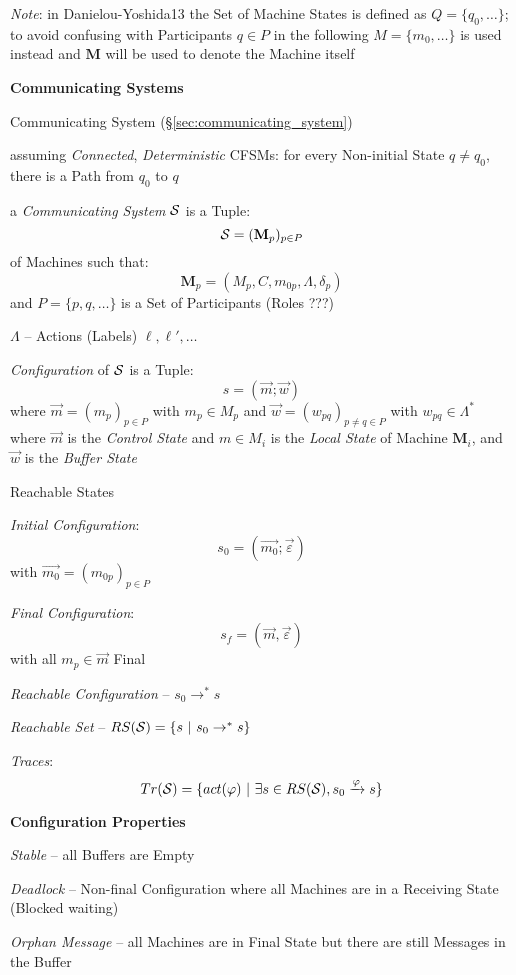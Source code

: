 \fist \emph{Note}: in Danielou-Yoshida13 the Set of Machine States is
defined as $Q = \{q_0,\ldots\}$; to avoid confusing with Participants
$q \in P$ in the following $M = \{m_0, \ldots\}$ is used instead and
$\mathbf{M}$ will be used to denote the Machine itself


\textbf{Communicating Systems}

\fist Communicating System (\S\ref{sec:communicating_system})

assuming \emph{Connected}, \emph{Deterministic} CFSMs: for every
Non-initial State $q \neq q_0$, there is a Path from $q_0$ to $q$

a \emph{Communicating System} $\mathcal{S}$ is a Tuple:
\[
  \mathcal{S} = (\mathbf{M}_p)_{p \in P}
\]
of Machines such that:
\[
  \mathbf{M}_p = (M_p, C, m_{0p}, \Lambda, \delta_p)
\]
and $P = \{p, q, \ldots\}$ is a Set of Participants (Roles ???) %

$\Lambda$ -- Actions (Labels) $\ell, \ell', \ldots$

\emph{Configuration} of $\mathcal{S}$ is a Tuple:
\[
  s = (\vec{m};\vec{w})
\]
where $\vec{m} = (m_p)_{p \in P}$ with $m_p \in M_p$ and $\vec{w} =
(w_{pq})_{p \neq q \in P}$ with $w_{pq} \in \Lambda^*$ where $\vec{m}$
is the \emph{Control State} and $m \in M_i$ is the \emph{Local State}
of Machine $\mathbf{M}_i$, and $\vec{w}$ is the \emph{Buffer State}

Reachable States

\emph{Initial Configuration}:
\[
  s_0 = (\vec{m_0};\vec{\varepsilon})
\]
with $\vec{m_0} = (m_{0p})_{p \in P}$

\emph{Final Configuration}:
\[
  s_f = (\vec{m}, \vec{\varepsilon})
\]
with all $m_p \in \vec{m}$ Final

\emph{Reachable Configuration} -- $s_0 \rightarrow^* s$

\emph{Reachable Set} -- $RS(\mathcal{S}) = \{ s\ |\ s_0 \rightarrow^* s\}$

\emph{Traces}:
\[
  Tr(\mathcal{S}) = \{ act(\varphi) \ |\
    \exists s \in RS(\mathcal{S}), s_0 \xrightarrow{\varphi} s \}
\]


\textbf{Configuration Properties}

\emph{Stable} -- all Buffers are Empty

\emph{Deadlock} -- Non-final Configuration where all Machines are in a
Receiving State (Blocked waiting)

\emph{Orphan Message} -- all Machines are in Final State but there are
still Messages in the Buffer

